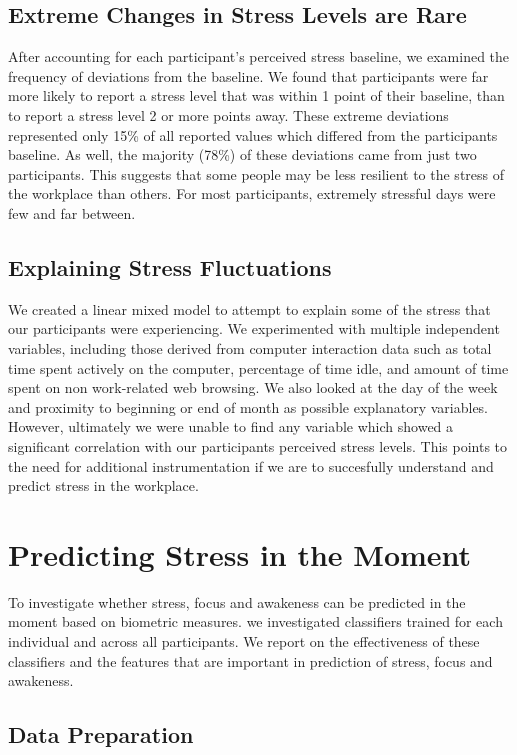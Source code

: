 \subsection{Extreme Changes in Stress Levels are Rare}
After accounting for each participant's perceived stress baseline, we
examined the frequency of deviations from the baseline. We found that
participants were far more likely to report a stress level that was
within 1 point of their baseline, than to report a stress level 2 or
more points away. These extreme deviations represented only 15\% of
all reported values which differed from the participants baseline. As
well, the majority (78\%) of these deviations came from just two
participants. This suggests that some people may be less resilient to
the stress of the workplace than others. For most participants,
extremely stressful days were few and far between.

\subsection{Explaining Stress Fluctuations}
We created a linear mixed model to attempt to explain some of the
stress that our participants were experiencing. We experimented with
multiple independent variables, including those derived from computer
interaction data such as total time spent actively on the computer,
percentage of time idle, and amount of time spent on non work-related
web browsing. We also looked at the day of the week and proximity to
beginning or end of month as possible explanatory variables. However,
ultimately we were unable to find any variable which showed a
significant correlation with our participants perceived stress
levels. This points to the need for additional instrumentation if we
are to succesfully understand and predict stress in the workplace.


\section{Predicting Stress in the Moment}
\label{secOverallAccuracy}

To investigate whether stress, focus and awakeness can be predicted in
the moment based on biometric measures.
we investigated classifiers trained
for each individual and across all participants. We report on the effectiveness of
these classifiers and the features that are important in prediction of stress, focus
and awakeness.

\subsection{Data Preparation}

